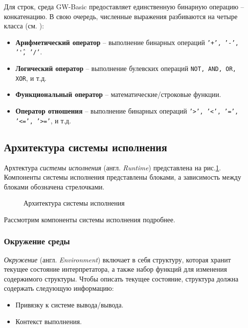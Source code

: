 \documentclass[12pt]{article}
\begin{document}
				\indent Для строк, среда GW-Basic предоставляет единственную бинарную операцию -- конкатенацию. В свою очередь, численные выражения разбиваются на четыре класса (см. \cite[стр.~46]{basicManual}):
				\begin{itemize}
					\item {\bf Арифметический оператор} -- выполнение бинарных операций {\tt '+', '-', '\^', '/'}.
					\item {\bf Логический оператор} -- выполнение булевских операций {\tt NOT, AND, OR, XOR}, и т.д. 
					\item {\bf Функциональный оператор} -- математические/строковые функции.
					\item {\bf Оператор отношения} -- выполнение бинарных операций {\tt '>', '<', '=', '<=', '>='}, и т.д.
				\end{itemize}
		\subsection{Архитектура системы исполнения}
			\label{subsec:runtimeArch}
			\hspace{\parindent} Архтектура {\it системы исполнения} (англ. {\it Runtime}) представлена на рис.\ref{fig:runtimeArch}. Компоненты системы исполнения представлены блоками, а зависимость между блоками обозначена стрелочками. 	
			\begin{figure}[h]
				\caption{Архитектура системы исполнения}
				\label{fig:runtimeArch}
			\end{figure}
			
			\indent Рассмотрим компоненты системы исполнения подробнее. 
			
			\subsubsection{Окружение среды}
			\hspace{\parindent} {\it Окружение} (англ. {\it Environment}) включает в себя структуру, которая хранит текущее состояние интерпретатора, а также набор функций для изменения содержимого структуры. Чтобы описать текущее состояние, структура должна содержать следующую информацию:
			\begin{itemize}
				\item Привязку к системе вывода/вывода.
				\item Контекст выполнения.
			\end{itemize}
\end{document}
